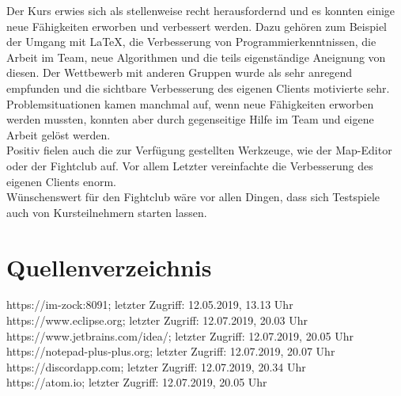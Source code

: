 \documentclass[12pt,a4paper,bibliography=totocnumbered,listof=totocnumbered,ngerman]{scrartcl}
\begin{document}
Der Kurs erwies sich als stellenweise recht herausfordernd und es konnten einige neue Fähigkeiten erworben und verbessert werden. Dazu gehören zum Beispiel der Umgang mit LaTeX, die Verbesserung von Programmierkenntnissen, die Arbeit im Team, neue Algorithmen und die teils eigenständige Aneignung von diesen. Der Wettbewerb mit anderen Gruppen wurde als sehr anregend empfunden und die sichtbare Verbesserung des eigenen Clients motivierte sehr.
Problemsituationen kamen manchmal auf, wenn neue Fähigkeiten erworben werden mussten, konnten aber durch gegenseitige Hilfe im Team und eigene Arbeit gelöst werden.\\
Positiv fielen auch die zur Verfügung gestellten Werkzeuge, wie der Map-Editor oder der Fightclub auf. Vor allem Letzter vereinfachte die Verbesserung des eigenen Clients enorm.\\
Wünschenswert für den Fightclub wäre vor allen Dingen, dass sich Testspiele auch von Kursteilnehmern starten lassen.


\newpage


\pagebreak


\renewcommand\refname{Quellenverzeichnis}


\section{Quellenverzeichnis}
https://im-zock:8091; letzter Zugriff: 12.05.2019, 13.13 Uhr\\
https://www.eclipse.org; letzter Zugriff: 12.07.2019, 20.03 Uhr\\
https://www.jetbrains.com/idea/; letzter Zugriff: 12.07.2019, 20.05 Uhr\\
https://notepad-plus-plus.org; letzter Zugriff: 12.07.2019, 20.07 Uhr\\
https://discordapp.com; letzter Zugriff: 12.07.2019, 20.34 Uhr\\
https://atom.io; letzter Zugriff: 12.07.2019, 20.05 Uhr\\
\pagebreak
\end{document}
